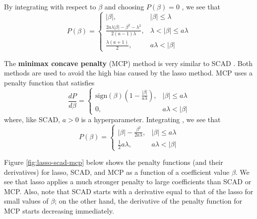 \documentclass{article}
\newcommand{\sign}{\text{sign}}
\begin{document}
By integrating with respect to $\beta$ and choosing $P(\beta) = 0$ \cite{breheny2016lasso}, we see that
\begin{equation}
	P(\beta) = \left\{\begin{array}{ll}
		\vert \beta \vert,&\vert \beta \vert \leq \lambda\\
		\frac{2a\lambda\vert\beta\vert - \beta^2-\lambda^2}{2(a - 1)\lambda},&\lambda < \vert \beta \vert \leq a\lambda\\
		\frac{\lambda(a + 1)}{2},&a\lambda < \vert \beta \vert
	\end{array}\right.
\end{equation}

The \textbf{minimax concave penalty} (MCP) method is very similar to SCAD \cite{zhang2010nearly}. Both methods are used to avoid the high bias caused by the lasso method. MCP uses a penalty function that satisfies
\begin{equation}
	\frac{dP}{d\beta} = \left\{\begin{array}{ll}
		\sign(\beta)\left(1 - \frac{\vert \beta \vert}{a\lambda}\right),& \vert \beta \vert \leq a\lambda\\
		0,&a\lambda < \vert \beta \vert
	\end{array}\right.
\end{equation}
where, like SCAD, $a>0$ is a hyperparameter. Integrating \cite{breheny2016lasso}, we see that
\begin{equation}
	P(\beta) = \left\{\begin{array}{ll}
		\vert \beta \vert - \frac{\beta^2}{2a\lambda},&\vert \beta \vert \leq a\lambda\\
		\frac{1}{2}a\lambda,&a\lambda < \vert \beta \vert
	\end{array}\right.
\end{equation}

Figure \ref{fig:lasso-scad-mcp} below shows the penalty functions (and their derivatives) for lasso, SCAD, and MCP as a function of a coefficient value $\beta$. We see that lasso applies a much stronger penalty to large coefficients than SCAD or MCP. Also, note that SCAD starts with a derivative equal to that of the lasso for small values of $\beta$; on the other hand, the derivative of the penalty function for MCP starts decreasing immediately.
\end{document}
